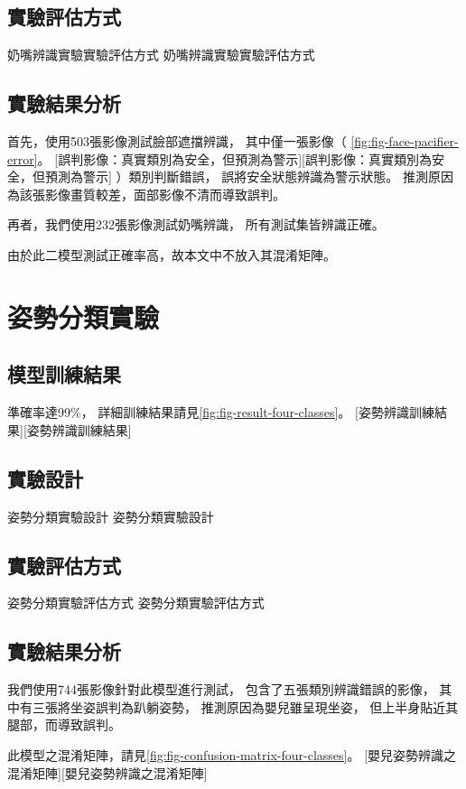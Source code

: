 \documentclass[class=NCU_thesis, crop=false]{standalone}
\begin{document}
\subsection{實驗評估方式}
奶嘴辨識實驗實驗評估方式 奶嘴辨識實驗實驗評估方式

\subsection{實驗結果分析}
首先，使用503張影像測試臉部遮擋辨識，
其中僅一張影像（
\cref{fig:fig-face-pacifier-error}。
[誤判影像：真實類別為安全，但預測為警示][誤判影像：真實類別為安全，但預測為警示]
）類別判斷錯誤，
誤將安全狀態辨識為警示狀態。
推測原因為該張影像畫質較差，面部影像不清而導致誤判。

再者，我們使用232張影像測試奶嘴辨識，
所有測試集皆辨識正確。

由於此二模型測試正確率高，故本文中不放入其混淆矩陣。

\section{姿勢分類實驗}
\subsection{模型訓練結果}
準確率達99\%，
詳細訓練結果請見\cref{fig:fig-result-four-classes}。
[姿勢辨識訓練結果][姿勢辨識訓練結果]

\subsection{實驗設計}
姿勢分類實驗設計 姿勢分類實驗設計

\subsection{實驗評估方式}
姿勢分類實驗評估方式 姿勢分類實驗評估方式

\subsection{實驗結果分析}
我們使用744張影像針對此模型進行測試，
包含了五張類別辨識錯誤的影像，
其中有三張將坐姿誤判為趴躺姿勢，
推測原因為嬰兒雖呈現坐姿，
但上半身貼近其腿部，而導致誤判。

此模型之混淆矩陣，請見\cref{fig:fig-confusion-matrix-four-classes}。
[嬰兒姿勢辨識之混淆矩陣][嬰兒姿勢辨識之混淆矩陣]
\end{document}
